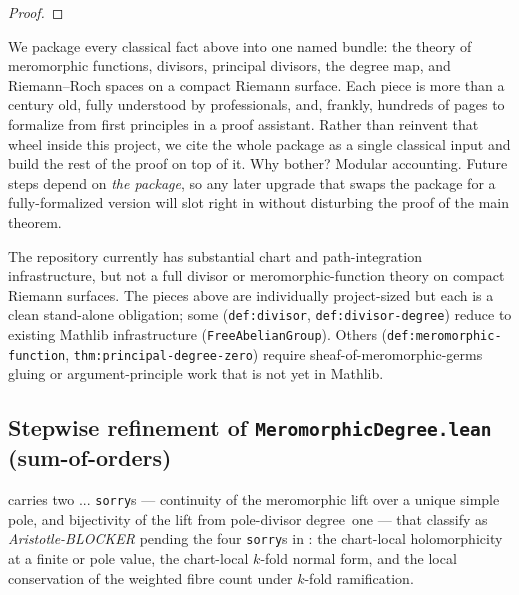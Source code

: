 \begin{proof}\leanok\end{proof}

\begin{layman}
We package every classical fact above into one named bundle: the theory
of meromorphic functions, divisors, principal divisors, the degree map,
and Riemann--Roch spaces on a compact Riemann surface. Each piece is more
than a century old, fully understood by professionals, and, frankly,
hundreds of pages to formalize from first principles in a proof
assistant. Rather than reinvent that wheel inside this project, we cite
the whole package as a single classical input and build the rest of the
proof on top of it. Why bother? Modular accounting. Future steps depend
on \emph{the package}, so any later upgrade that swaps the package for
a fully-formalized version will slot right in without disturbing the
proof of the main theorem.
\end{layman}

\begin{formalizationnote}
The repository currently has substantial chart and path-integration
infrastructure, but not a full divisor or meromorphic-function theory on
compact Riemann surfaces. The pieces above are individually
project-sized but each is a clean stand-alone obligation; some
(\texttt{def:divisor}, \texttt{def:divisor-degree}) reduce to existing
Mathlib infrastructure (\texttt{FreeAbelianGroup}). Others
(\texttt{def:meromorphic-function}, \texttt{thm:principal-degree-zero})
require sheaf-of-meromorphic-germs gluing or argument-principle work
that is not yet in Mathlib.
\end{formalizationnote}
\subsection{Stepwise refinement of \texttt{MeromorphicDegree.lean}
(sum-of-orders)}
\label{subsec:meromorphic-degree-refinement}





 carries two
...
\texttt{sorry}s --- continuity of the meromorphic lift over a unique
simple pole, and bijectivity of the lift from pole-divisor degree~one ---
that classify as \emph{Aristotle-BLOCKER} pending the four \texttt{sorry}s
in : the
chart-local holomorphicity at a finite or pole value, the chart-local
\(k\)-fold normal form, and the local conservation of the weighted
fibre count under \(k\)-fold ramification.

